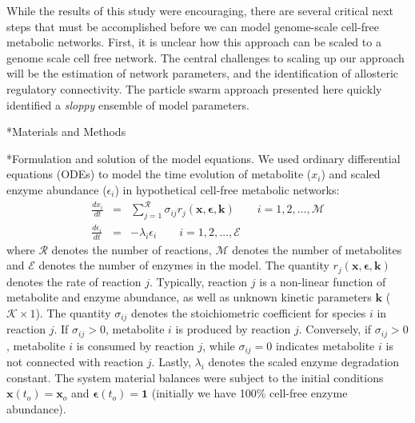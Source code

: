 \documentclass[12pt]{article}
\makeatletter
\renewcommand\subsection{\@startsection
	{subsection}{2}{0mm}
	{-0.05in}
	{-0.5\baselineskip}
	{\normalfont\normalsize\bfseries}}
\renewcommand\section{\@startsection
	{subsection}{2}{0mm}
	{-0.2in}
	{0.05\baselineskip}
	{\normalfont\large\bfseries}}
\makeatother
\begin{document}
While the results of this study were encouraging, there are several critical next steps that must be accomplished before we can model genome-scale cell-free metabolic networks.
First, it is unclear how this approach can be scaled to a genome scale cell free network. The central challenges to scaling up our approach will be the estimation of network parameters, 
and the identification of allosteric regulatory connectivity. The particle swarm approach presented here quickly identified a \emph{sloppy} ensemble of model parameters. 


\clearpage

\section*{Materials and Methods}

\subsection*{Formulation and solution of the model equations.}
We used ordinary differential equations (ODEs) to model the time evolution of metabolite ($x_{i}$) and scaled enzyme abundance ($\epsilon_{i}$) in hypothetical cell-free metabolic networks:
\begin{eqnarray}
	\frac{dx_{i}}{dt} & = & \sum_{j = 1}^{\mathcal{R}}\sigma_{ij}r_{j}\left(\mathbf{x},\mathbf{\epsilon},\mathbf{k}\right)\qquad{i=1,2,\hdots,\mathcal{M}}\\
	\frac{d\epsilon_{i}}{dt} & = & -\lambda_{i}\epsilon_{i}\qquad{i = 1,2,\hdots,\mathcal{E}}
\end{eqnarray}where $\mathcal{R}$ denotes the number of reactions, $\mathcal{M}$ denotes the number of metabolites and $\mathcal{E}$ denotes the number of enzymes in the model. 
The quantity $r_{j}\left(\mathbf{x},\mathbf{\epsilon},\mathbf{k}\right)$ denotes the rate of reaction $j$. 
Typically, reaction $j$ is a non-linear function of metabolite and enzyme abundance, as well as unknown kinetic parameters $\mathbf{k}$ ($\mathcal{K}\times{1}$). 
The quantity $\sigma_{ij}$ denotes the stoichiometric coefficient for species $i$ in reaction $j$. 
If $\sigma_{ij}>0$, metabolite $i$ is produced by reaction $j$. 
Conversely, if $\sigma_{ij}>0$, metabolite $i$ is consumed by reaction $j$, while $\sigma_{ij} = 0$ indicates metabolite $i$ is not connected with reaction $j$. 
Lastly, $\lambda_{i}$ denotes the scaled enzyme degradation constant. 
The system material balances were subject to the initial conditions $\mathbf{x}\left(t_{o}\right) = \mathbf{x}_{o}$ and $\mathbf{\epsilon}\left(t_{o}\right) = \mathbf{1}$ (initially we have 100\% cell-free enzyme abundance). 
\end{document}
